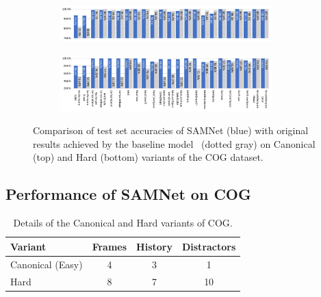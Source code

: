 \begin{figure}[htbp]
	\centering
	\begin{subfigure}{\textwidth}
		\centering
		\includegraphics[width=0.9\textwidth]{../img/plots/cog_canonical_baseline_no_labels.pdf}
	\end{subfigure}%
	\newline
	\begin{subfigure}{\textwidth}
		\centering
		\includegraphics[width=0.9\textwidth]{../img/plots/cog_hard_baseline_labels.pdf}
	\end{subfigure}%
	\caption{Comparison of test set accuracies of SAMNet (blue) with original results achieved by the baseline model~\cite{yang2018dataset} (dotted gray) on Canonical (top) and Hard (bottom) variants of the COG dataset.}
	\label{fig:samnet_cog_detailed}
\end{figure}


\subsection{Performance of SAMNet on COG}
\label{sec:cog-baseline-compare}



\begin{table}[ht]
	\centering
		\begin{tabular}{lccc}
			\toprule
			Variant	& Frames & History	& Distractors \\
			\midrule
			Canonical (Easy) & 4 & 3 & 1\\
			Hard  & 8 & 7 & 10\\
			\bottomrule
		\end{tabular}
	\caption{Details of the Canonical and Hard variants of COG.}
	\label{tab:cog_variants}
\end{table}\vspace{5pt}

